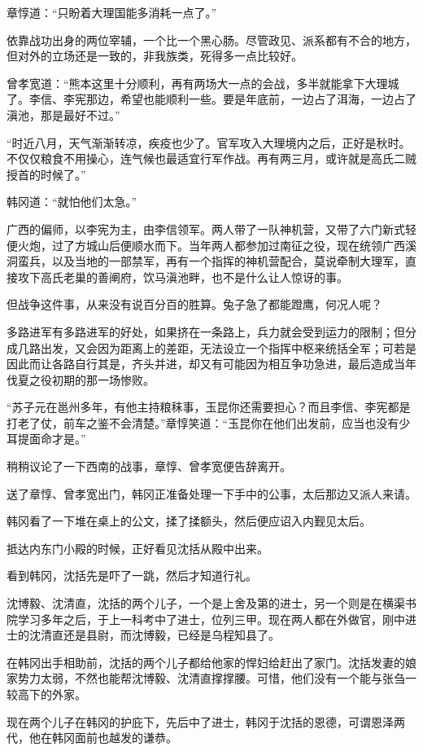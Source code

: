 章惇道：“只盼着大理国能多消耗一点了。”

依靠战功出身的两位宰辅，一个比一个黑心肠。尽管政见、派系都有不合的地方，但对外的立场还是一致的，非我族类，死得多一点比较好。

曾孝宽道：“熊本这里十分顺利，再有两场大一点的会战，多半就能拿下大理城了。李信、李宪那边，希望也能顺利一些。要是年底前，一边占了洱海，一边占了滇池，那是最好不过。”

“时近八月，天气渐渐转凉，疾疫也少了。官军攻入大理境内之后，正好是秋时。不仅仅粮食不用操心，连气候也最适宜行军作战。再有两三月，或许就是高氏二贼授首的时候了。”

韩冈道：“就怕他们太急。”

广西的偏师，以李宪为主，由李信领军。两人带了一队神机营，又带了六门新式轻便火炮，过了方城山后便顺水而下。当年两人都参加过南征之役，现在统领广西溪洞蛮兵，以及当地的一部禁军，再有一个指挥的神机营配合，莫说牵制大理军，直接攻下高氏老巢的善阐府，饮马滇池畔，也不是什么让人惊讶的事。

但战争这件事，从来没有说百分百的胜算。兔子急了都能蹬鹰，何况人呢？

多路进军有多路进军的好处，如果挤在一条路上，兵力就会受到运力的限制；但分成几路出发，又会因为距离上的差距，无法设立一个指挥中枢来统括全军；可若是因此而让各路自行其是，齐头并进，却又有可能因为相互争功急进，最后造成当年伐夏之役初期的那一场惨败。

“苏子元在邕州多年，有他主持粮秣事，玉昆你还需要担心？而且李信、李宪都是打老了仗，前车之鉴不会清楚。”章惇笑道：“玉昆你在他们出发前，应当也没有少耳提面命才是。”

稍稍议论了一下西南的战事，章惇、曾孝宽便告辞离开。

送了章惇、曾孝宽出门，韩冈正准备处理一下手中的公事，太后那边又派人来请。

韩冈看了一下堆在桌上的公文，揉了揉额头，然后便应诏入内觐见太后。

抵达内东门小殿的时候，正好看见沈括从殿中出来。

看到韩冈，沈括先是吓了一跳，然后才知道行礼。

沈博毅、沈清直，沈括的两个儿子，一个是上舍及第的进士，另一个则是在横渠书院学习多年之后，于上一科考中了进士，位列三甲。现在两人都在外做官，刚中进士的沈清直还是县尉，而沈博毅，已经是乌程知县了。

在韩冈出手相助前，沈括的两个儿子都给他家的悍妇给赶出了家门。沈括发妻的娘家势力太弱，不然也能帮沈博毅、沈清直撑撑腰。可惜，他们没有一个能与张刍一较高下的外家。

现在两个儿子在韩冈的护庇下，先后中了进士，韩冈于沈括的恩德，可谓恩泽两代，他在韩冈面前也越发的谦恭。


